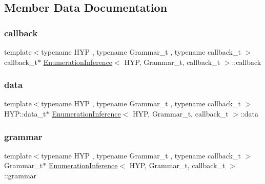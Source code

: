 \subsection{Member Data Documentation}
\mbox{\label{class_enumeration_inference_a792b247c4874b9f879ac204749bea1c3}} 
\subsubsection{\texorpdfstring{callback}{callback}}
{\footnotesize\ttfamily template$<$typename H\+YP , typename Grammar\+\_\+t , typename callback\+\_\+t $>$ \\
callback\+\_\+t$\ast$ \hyperlink{class_enumeration_inference}{Enumeration\+Inference}$<$ H\+YP, Grammar\+\_\+t, callback\+\_\+t $>$\+::callback}

\mbox{\label{class_enumeration_inference_a74a0f7bcc9701f2078a9dedea4352e63}} 
\subsubsection{\texorpdfstring{data}{data}}
{\footnotesize\ttfamily template$<$typename H\+YP , typename Grammar\+\_\+t , typename callback\+\_\+t $>$ \\
H\+Y\+P\+::data\+\_\+t$\ast$ \hyperlink{class_enumeration_inference}{Enumeration\+Inference}$<$ H\+YP, Grammar\+\_\+t, callback\+\_\+t $>$\+::data}

\mbox{\label{class_enumeration_inference_a5bba83e097730fd566d0a47336c9473d}} 
\subsubsection{\texorpdfstring{grammar}{grammar}}
{\footnotesize\ttfamily template$<$typename H\+YP , typename Grammar\+\_\+t , typename callback\+\_\+t $>$ \\
Grammar\+\_\+t$\ast$ \hyperlink{class_enumeration_inference}{Enumeration\+Inference}$<$ H\+YP, Grammar\+\_\+t, callback\+\_\+t $>$\+::grammar}

